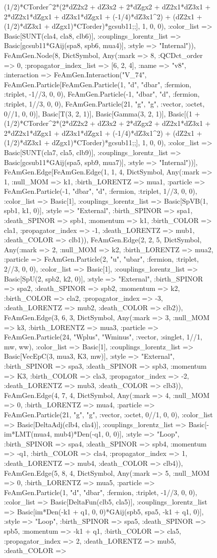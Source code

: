 \documentclass{revtex4}
\begin{document}
\begin{figure}[!htb]
\begin{center}
{(1/2)*CTorder^2*(2*dZ2x2 + dZ3x2 + 2*dZgx2 + dZ2x1*dZ3x1 + 2*dZ2x1*dZgx1 + dZ3x1*dZgx1 + (-1/4)*dZ3x1^2) + (dZ2x1 + (1/2)*dZ3x1 + dZgx1)*CTorder)*gcsub11;;], 1, 0, 0), :color_list => Basic[SUNT(cla4, cla8, clb6)], :couplings_lorentz_list => Basic[gcsub11*GAij(spa8, spb6, mua4)], :style => "Internal")), FeAmGen.Node(8, Dict{Symbol, Any}(:mark => 8, :QCDct_order => 0, :propagator_index_list => [6, 2, 4], :name => "v8", :interaction => FeAmGen.Interaction("V_74", FeAmGen.Particle[FeAmGen.Particle(1, "d", "dbar", :fermion, :triplet, -1//3, 0, 0), FeAmGen.Particle(-1, "dbar", "d", :fermion, :triplet, 1//3, 0, 0), FeAmGen.Particle(21, "g", "g", :vector, :octet, 0//1, 0, 0)], Basic[T(3, 2, 1)], Basic[Gamma(3, 2, 1)], Basic[(1 + (1/2)*CTorder^2*(2*dZ2x2 + dZ3x2 + 2*dZgx2 + dZ2x1*dZ3x1 + 2*dZ2x1*dZgx1 + dZ3x1*dZgx1 + (-1/4)*dZ3x1^2) + (dZ2x1 + (1/2)*dZ3x1 + dZgx1)*CTorder)*gcsub11;;], 1, 0, 0), :color_list => Basic[SUNT(cla7, cla5, clb9)], :couplings_lorentz_list => Basic[gcsub11*GAij(spa5, spb9, mua7)], :style => "Internal"))], FeAmGen.Edge[FeAmGen.Edge(1, 1, 4, Dict{Symbol, Any}(:mark => 1, :null_MOM => k1, :birth_LORENTZ => mua1, :particle => FeAmGen.Particle(-1, "dbar", "d", :fermion, :triplet, 1//3, 0, 0), :color_list => Basic[1], :couplings_lorentz_list => Basic[SpVB(1, spb1, k1, 0)], :style => "External", :birth_SPINOR => spa1, :death_SPINOR => spb1, :momentum => k1, :birth_COLOR => cla1, :propagator_index => -1, :death_LORENTZ => mub1, :death_COLOR => clb1)), FeAmGen.Edge(2, 2, 5, Dict{Symbol, Any}(:mark => 2, :null_MOM => k2, :birth_LORENTZ => mua2, :particle => FeAmGen.Particle(2, "u", "ubar", :fermion, :triplet, 2//3, 0, 0), :color_list => Basic[1], :couplings_lorentz_list => Basic[SpU(2, spb2, k2, 0)], :style => "External", :birth_SPINOR => spa2, :death_SPINOR => spb2, :momentum => k2, :birth_COLOR => cla2, :propagator_index => -3, :death_LORENTZ => mub2, :death_COLOR => clb2)), FeAmGen.Edge(3, 6, 3, Dict{Symbol, Any}(:mark => 3, :null_MOM => k3, :birth_LORENTZ => mua3, :particle => FeAmGen.Particle(24, "Wplus", "Wminus", :vector, :singlet, 1//1, mw, ww), :color_list => Basic[1], :couplings_lorentz_list => Basic[VecEpC(3, mua3, K3, mw)], :style => "External", :birth_SPINOR => spa3, :death_SPINOR => spb3, :momentum => K3, :birth_COLOR => cla3, :propagator_index => -2, :death_LORENTZ => mub3, :death_COLOR => clb3)), FeAmGen.Edge(4, 7, 4, Dict{Symbol, Any}(:mark => 4, :null_MOM => 0, :birth_LORENTZ => mua4, :particle => FeAmGen.Particle(21, "g", "g", :vector, :octet, 0//1, 0, 0), :color_list => Basic[DeltaAdj(clb4, cla4)], :couplings_lorentz_list => Basic[-im*LMT(mua4, mub4)*Den(-q1, 0, 0)], :style => "Loop", :birth_SPINOR => spa4, :death_SPINOR => spb4, :momentum => -q1, :birth_COLOR => cla4, :propagator_index => 1, :death_LORENTZ => mub4, :death_COLOR => clb4)), FeAmGen.Edge(5, 8, 4, Dict{Symbol, Any}(:mark => 5, :null_MOM => 0, :birth_LORENTZ => mua5, :particle => FeAmGen.Particle(1, "d", "dbar", :fermion, :triplet, -1//3, 0, 0), :color_list => Basic[DeltaFun(clb5, cla5)], :couplings_lorentz_list => Basic[im*Den(-k1 + q1, 0, 0)*GAij(spb5, spa5, -k1 + q1, 0)], :style => "Loop", :birth_SPINOR => spa5, :death_SPINOR => spb5, :momentum => -k1 + q1, :birth_COLOR => cla5, :propagator_index => 2, :death_LORENTZ => mub5, :death_COLOR => }
\end{center}
\end{figure}
\end{document}
